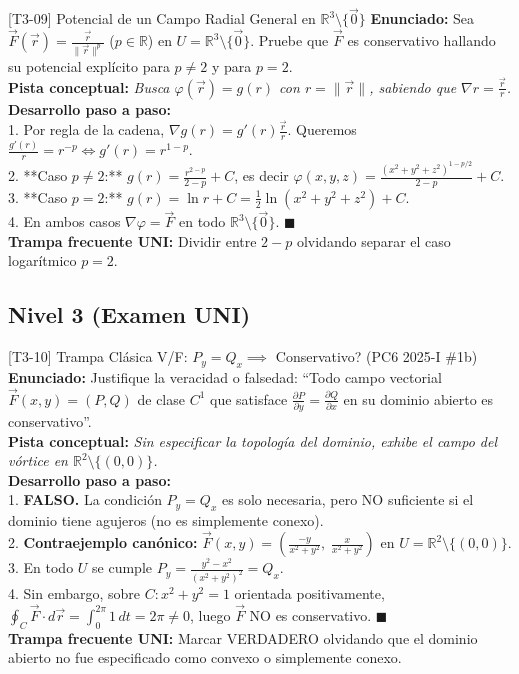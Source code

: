 \documentclass[11pt,a4paper]{article}
\begin{document}
\begin{ejerciciobox}{[T3-09] Potencial de un Campo Radial General en $\mathbb{R}^3 \setminus \{\vec{0}\}$}
\textbf{Enunciado:} Sea $\vec{F}(\vec{r}) = \frac{\vec{r}}{\|\vec{r}\|^p}$ ($p \in \mathbb{R}$) en $U = \mathbb{R}^3 \setminus \{\vec{0}\}$. Pruebe que $\vec{F}$ es conservativo hallando su potencial explícito para $p \neq 2$ y para $p = 2$.\\[0.2cm]
\textbf{Pista conceptual:} \emph{Busca $\varphi(\vec{r}) = g(r)$ con $r = \|\vec{r}\|$, sabiendo que $\nabla r = \frac{\vec{r}}{r}$.}\\[0.2cm]
\textbf{Desarrollo paso a paso:}\\
1. Por regla de la cadena, $\nabla g(r) = g'(r)\frac{\vec{r}}{r}$. Queremos $\frac{g'(r)}{r} = r^{-p} \iff g'(r) = r^{1-p}$.\\
2. **Caso $p \neq 2$:** $g(r) = \frac{r^{2-p}}{2-p} + C$, es decir $\varphi(x,y,z) = \frac{(x^2+y^2+z^2)^{1 - p/2}}{2-p} + C$.\\
3. **Caso $p = 2$:** $g(r) = \ln r + C = \frac{1}{2}\ln(x^2+y^2+z^2) + C$.\\
4. En ambos casos $\nabla\varphi = \vec{F}$ en todo $\mathbb{R}^3 \setminus \{\vec{0}\}$. $\blacksquare$\\[0.2cm]
\textbf{Trampa frecuente UNI:} Dividir entre $2 - p$ olvidando separar el caso logarítmico $p = 2$.
\end{ejerciciobox}

\subsection{Nivel 3 (Examen UNI)}

\begin{ejerciciobox}{[T3-10] Trampa Clásica V/F: $P_y = Q_x \implies$ Conservativo? (PC6 2025-I \#1b)}
\textbf{Enunciado:} Justifique la veracidad o falsedad: ``Todo campo vectorial $\vec{F}(x,y) = (P, Q)$ de clase $C^1$ que satisface $\frac{\partial P}{\partial y} = \frac{\partial Q}{\partial x}$ en su dominio abierto es conservativo''.\\[0.2cm]
\textbf{Pista conceptual:} \emph{Sin especificar la topología del dominio, exhibe el campo del vórtice en $\mathbb{R}^2 \setminus \{(0,0)\}$.}\\[0.2cm]
\textbf{Desarrollo paso a paso:}\\
1. \textbf{FALSO.} La condición $P_y = Q_x$ es solo necesaria, pero NO suficiente si el dominio tiene agujeros (no es simplemente conexo).\\
2. \textbf{Contraejemplo canónico:} $\vec{F}(x,y) = \left(\frac{-y}{x^2+y^2},\; \frac{x}{x^2+y^2}\right)$ en $U = \mathbb{R}^2 \setminus \{(0,0)\}$.\\
3. En todo $U$ se cumple $P_y = \frac{y^2 - x^2}{(x^2+y^2)^2} = Q_x$.\\
4. Sin embargo, sobre $C: x^2+y^2 = 1$ orientada positivamente, $\oint_C \vec{F}\cdot d\vec{r} = \int_0^{2\pi} 1\,dt = 2\pi \neq 0$, luego $\vec{F}$ NO es conservativo. $\blacksquare$\\[0.2cm]
\textbf{Trampa frecuente UNI:} Marcar VERDADERO olvidando que el dominio abierto no fue especificado como convexo o simplemente conexo.
\end{ejerciciobox}
\end{document}

